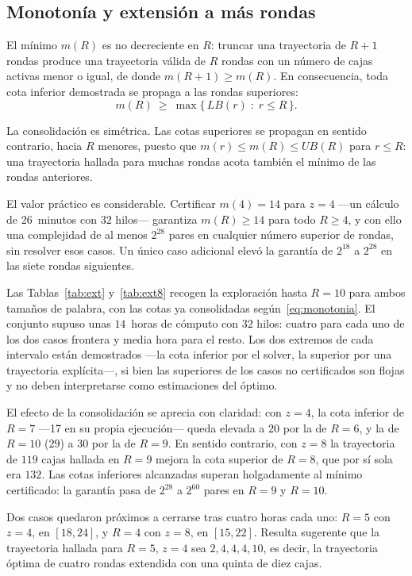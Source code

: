 \documentclass[conference]{IEEEtran}
\begin{document}
\subsection{Monotonía y extensión a más rondas}\label{sec:monotonia}

El mínimo $m(R)$ es no decreciente en $R$: truncar una trayectoria de $R+1$ rondas produce
una trayectoria válida de $R$ rondas con un número de cajas activas menor o igual, de donde
$m(R+1)\ge m(R)$. En consecuencia, toda cota inferior demostrada se propaga a las rondas
superiores:
\begin{equation}\label{eq:monotonia}
m(R)\ \ge\ \max\{\,LB(r)\;:\;r\le R\,\}.
\end{equation}

La consolidación es simétrica. Las cotas superiores se propagan en sentido contrario,
hacia $R$ menores, puesto que $m(r)\le m(R)\le UB(R)$ para $r\le R$: una trayectoria hallada
para muchas rondas acota también el mínimo de las rondas anteriores.

El valor práctico es considerable. Certificar $m(4)=14$ para $z=4$ ---un cálculo de
$26$~minutos con $32$ hilos--- garantiza $m(R)\ge14$ para todo $R\ge4$, y con ello una
complejidad de al menos $2^{28}$ pares en cualquier número superior de rondas, sin
resolver esos casos. Un único caso adicional elevó la garantía de $2^{18}$ a $2^{28}$ en
las siete rondas siguientes.

Las Tablas~\ref{tab:ext} y~\ref{tab:ext8} recogen la exploración hasta $R=10$ para ambos
tamaños de palabra, con las cotas ya consolidadas según~\eqref{eq:monotonia}. El conjunto
supuso unas $14$~horas de cómputo con $32$ hilos: cuatro para cada uno de los dos casos
frontera y media hora para el resto. Los dos extremos de cada intervalo están demostrados
---la cota inferior por el solver, la superior por una trayectoria explícita---, si bien
las superiores de los casos no certificados son flojas y no deben interpretarse como
estimaciones del óptimo.

El efecto de la consolidación se aprecia con claridad: con $z=4$, la cota inferior de
$R=7$ ---17 en su propia ejecución--- queda elevada a $20$ por la de $R=6$, y la de $R=10$
($29$) a $30$ por la de $R=9$. En sentido contrario, con $z=8$ la trayectoria de $119$
cajas hallada en $R=9$ mejora la cota superior de $R=8$, que por sí sola era $132$. Las
cotas inferiores alcanzadas superan holgadamente al mínimo certificado: la garantía pasa
de $2^{28}$ a $2^{60}$ pares en $R=9$ y $R=10$.

Dos casos quedaron próximos a cerrarse tras cuatro horas cada uno: $R=5$ con $z=4$, en
$[18,24]$, y $R=4$ con $z=8$, en $[15,22]$. Resulta sugerente que la trayectoria hallada
para $R=5$, $z=4$ sea $2,4,4,4,10$, es decir, la trayectoria óptima de cuatro rondas
extendida con una quinta de diez cajas.
\end{document}
